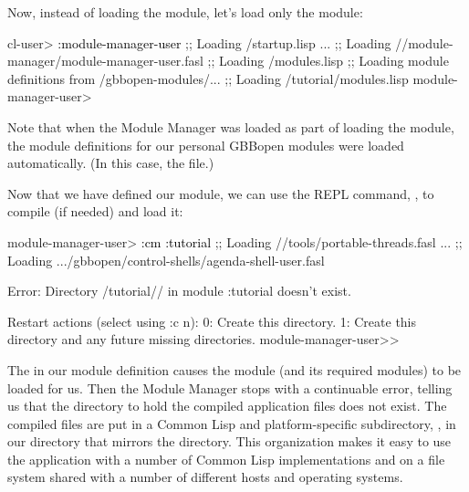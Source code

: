 \documentclass[10pt,twoside,english,pdftex]{article}
\begin{document}
Now, instead of loading the  module, let's
load only the  module:
%
\W\supp
\begin{example}
\textcolor{darkergray}{%
  cl-user> \textcolor{black}{:module-manager-user}
  ;; Loading /startup.lisp
     ...
  ;;     Loading //module-manager/module-manager-user.fasl
  ;;   Loading /modules.lisp
  ;; Loading module definitions from /gbbopen-modules/...
  ;;     Loading /tutorial/modules.lisp
  module-manager-user>}
\end{example}
%
Note that when the Module Manager was loaded as part of loading the
 module, the module definitions for our
personal GBBopen modules were loaded automatically.  (In this case, the
 file.)

%
%
Now that we have defined our  module, we can use the
 REPL command, , to compile (if
needed) and load it:
%
\W\supp
\begin{example}
\textcolor{darkergray}{%
  module-manager-user> \textcolor{black}{:cm :tutorial}
  ;;   Loading //tools/portable-threads.fasl
     ...
  ;;   Loading .../gbbopen/control-shells/agenda-shell-user.fasl

  Error: Directory /tutorial// 
         in module :tutorial doesn't exist.

  Restart actions (select using :c n):
    0: Create this directory.
    1: Create this directory and any future missing directories.
  module-manager-user>>}
\end{example}
%
The  in our  module definition causes the
 module (and its required modules) to be
loaded for us.  Then the Module Manager stops with a continuable error,
telling us that the directory to hold the compiled application files does not
exist.  The compiled files are put in a Common Lisp and platform-specific
subdirectory, , in our 
directory that mirrors the  directory.  This organization makes
it easy to use the application with a number of Common Lisp implementations
and on a file system shared with a number of different hosts and operating
systems.
\end{document}
